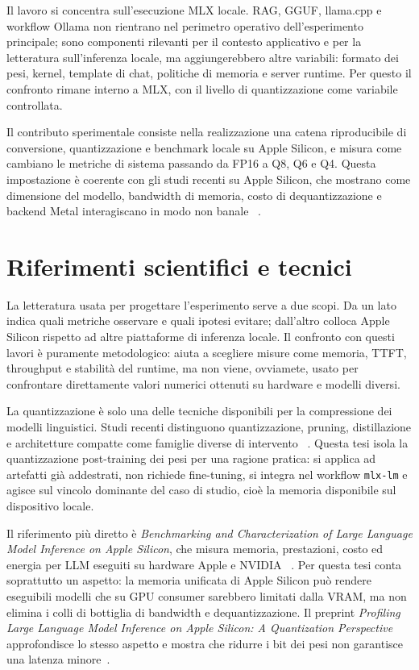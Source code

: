 Il lavoro si concentra sull'esecuzione MLX locale. RAG, GGUF, llama.cpp e
workflow Ollama non rientrano nel perimetro operativo dell'esperimento
principale; sono componenti rilevanti per il contesto applicativo e per la
letteratura sull'inferenza locale, ma aggiungerebbero altre variabili: formato
dei pesi, kernel, template di chat, politiche di memoria e server runtime. Per
questo il confronto rimane interno a MLX, con il livello di quantizzazione come
variabile controllata.

Il contributo sperimentale consiste nella realizzazione una catena riproducibile di conversione, quantizzazione e
benchmark locale su Apple Silicon, e misura come cambiano le metriche di
sistema passando da FP16 a Q8, Q6 e Q4. Questa impostazione è coerente con gli
studi recenti su Apple Silicon, che mostrano come dimensione del modello,
bandwidth di memoria, costo di dequantizzazione e backend Metal interagiscano
in modo non banale
~\cite{benazir2025applebenchmark,benazir2025profiling}.

\section{Riferimenti scientifici e tecnici}
\label{sec:experimental_literature}

La letteratura usata per progettare l'esperimento serve a due scopi. Da un lato
indica quali metriche osservare e quali ipotesi evitare; dall'altro colloca
Apple Silicon rispetto ad altre piattaforme di inferenza locale. Il confronto
con questi lavori è puramente metodologico: aiuta a scegliere misure come memoria, TTFT,
throughput e stabilità del runtime, ma non viene, ovviamete, usato per confrontare
direttamente valori numerici ottenuti su hardware e modelli diversi.

La quantizzazione è solo una delle tecniche disponibili per la compressione dei modelli
linguistici. Studi recenti distinguono quantizzazione, pruning,
distillazione e architetture compatte come famiglie diverse di intervento
~\cite{wang2024modelcompression}. Questa tesi isola la quantizzazione
post-training dei pesi per una ragione pratica: si applica ad artefatti già
addestrati, non richiede fine-tuning, si integra nel workflow \texttt{mlx-lm} e
agisce sul vincolo dominante del caso di studio, cioè la memoria disponibile
sul dispositivo locale.

Il riferimento più diretto è \emph{Benchmarking and Characterization of Large
Language Model Inference on Apple Silicon}, che misura memoria, prestazioni,
costo ed energia per LLM eseguiti su hardware Apple e NVIDIA
~\cite{benazir2025applebenchmark}. Per questa tesi conta soprattutto un aspetto:
la memoria unificata di Apple Silicon può rendere eseguibili modelli che su
GPU consumer sarebbero limitati dalla VRAM, ma non elimina i colli di bottiglia
di bandwidth e dequantizzazione. Il preprint \emph{Profiling Large Language
Model Inference on Apple Silicon: A Quantization Perspective} approfondisce lo
stesso aspetto e mostra che ridurre i bit dei pesi non garantisce una latenza
minore~\cite{benazir2025profiling}.


